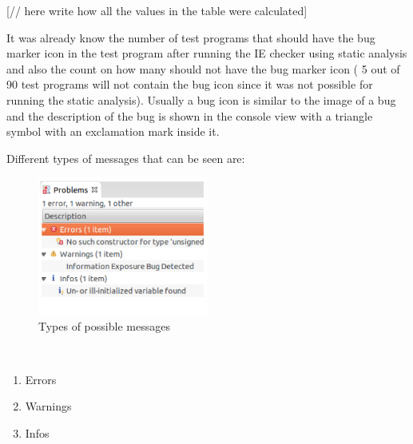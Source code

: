 [// here write how all the values in the table were calculated]



It was already know the number of test programs that should have the bug marker icon in the
test program after running the IE checker using static analysis and 
also the count on how many should not have the bug marker icon ( 5 out of 90 test
programs will not contain the bug icon since it was not possible for running the
static analysis). Usually a bug icon is similar to the image of a bug and the description of the
bug is shown in the console view with a triangle symbol with an exclamation mark inside it.

Different types of messages that can be seen are:
\begin{figure}[!htb]
\centering
\includegraphics[width=0.5\textwidth]{png/Types.png}
\caption{Types of possible messages}
\label{fig:types}
\end{figure}\\

\begin{enumerate}
\item Errors
\item Warnings
\item Infos
\end{enumerate}

